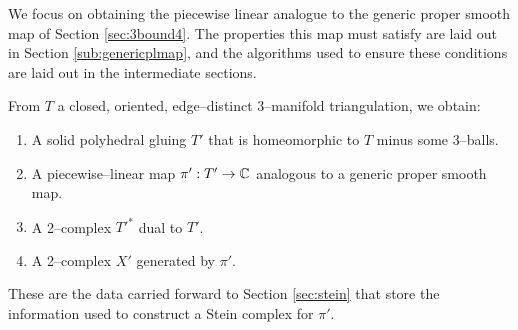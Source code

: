 We focus on obtaining the piecewise linear analogue to the generic proper smooth map of Section \ref{sec:3bound4}.
The properties this map must satisfy are laid out in Section \ref{sub:genericplmap}, and the algorithms used to ensure these conditions are laid out in the intermediate sections.

From $T$ a closed, oriented, edge--distinct 3--manifold triangulation, we obtain:
\begin{enumerate}
	\item A solid polyhedral gluing $T'$ that is homeomorphic to $T$ minus some 3--balls.
	\item A piecewise--linear map $\pi':T'\to\mathbb{C}$ analogous to a generic proper smooth map.
	\item A 2--complex $T'^*$ dual to $T'$.
	\item A 2--complex $X'$ generated by $\pi'$.
\end{enumerate}
These are the data carried forward to Section \ref{sec:stein} that store the information used to construct a Stein complex for $\pi'$.